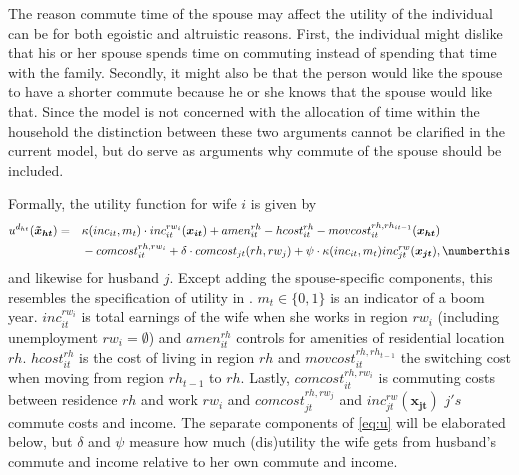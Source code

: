 The reason commute time of the spouse may affect the utility of the individual can be for both egoistic and altruistic reasons. First, the individual might dislike that his or her spouse spends time on commuting instead of spending that time with the family. Secondly, it might also be that the person would like the spouse to have a shorter commute because he or she knows that the spouse would like that. Since the model is not concerned with the allocation of time within the household the distinction between these two arguments cannot be clarified in the current model, but do serve as arguments why commute of the spouse should be included.

Formally, the utility function for wife $i$ is given by
\begin{alignat*}{3}
&u^{d_{ht}}(\boldsymbol{\tilde{x}_{ht}})=&&\kappa(inc_{it},m_t)\cdot inc_{it}^{rw_i}(\boldsymbol{x_{it}})+amen_{it}^{rh}-hcost_{it}^{rh}-movcost_{it}^{rh,rh_{it-1}}(\boldsymbol{x_{ht}}) \\
& &&-comcost_{it}^{rh,rw_i}+\delta \cdot comcost_{jt}(rh,rw_j)+\psi\cdot \kappa(inc_{it},m_t) inc_{jt}^{rw}(\boldsymbol{x_{jt}}),\numberthis \label{eq:u}
\end{alignat*}
and likewise for husband $j$. Except adding the spouse-specific components, this resembles the specification of utility in \citet{Buchinsky2014}. $m_t\in\{0,1\}$ is an indicator of a boom year. $inc_{it}^{rw_i}$ is total earnings of the wife when she works in region $rw_i$ (including unemployment $rw_i=\emptyset$) and $amen_{it}^{rh}$ controls for amenities of residential location $rh$. $hcost_{it}^{rh}$ is the cost of living in region $rh$ and $movcost_{it}^{rh,rh_{t-1}}$ the switching cost when moving from region $rh_{t-1}$ to $rh$. Lastly, $comcost_{it}^{rh,rw_i}$ is commuting costs between residence $rh$ and work $rw_i$ and $comcost_{jt}^{rh,rw_j}$ and $inc_{jt}^{rw}(\boldsymbol{x_{jt}})$ $j's$ commute costs and income. The separate components of \eqref{eq:u} will be elaborated below, but $\delta$ and $\psi$ measure how much (dis)utility the wife gets from husband's commute and income relative to her own commute and income. 

